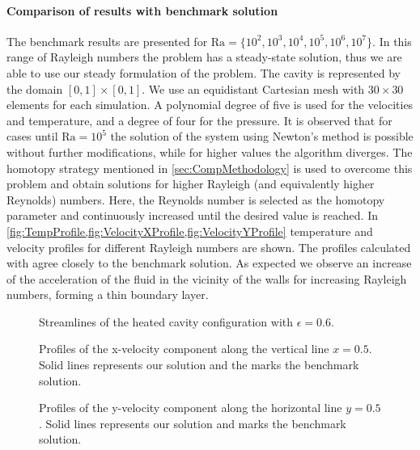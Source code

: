 \paragraph{Comparison of results with benchmark solution}
The benchmark results \cite{vierendeelsBenchmarkSolutionsNatural2003} are presented for $\text{Ra} = \{10^2,10^3,10^4,10^5,10^6,10^7\}$. In this range of Rayleigh numbers the problem has a steady-state solution, thus we are able to use our steady formulation of the problem. The cavity is represented by the domain $[0,1]\times[0,1]$. We use an equidistant Cartesian mesh with $30 \times 30$ elements for each simulation. A polynomial degree of five is used for the velocities and temperature, and a degree of four for the pressure. 
It is observed that for cases until  $\text{Ra} = 10^5$ the solution of the system using Newton's method is possible without further modifications, while for higher values the algorithm diverges. The homotopy strategy mentioned in \cref{sec:CompMethodology} is used to overcome this problem and obtain solutions for higher Rayleigh (and equivalently higher Reynolds) numbers. Here, the Reynolds number is selected as the homotopy parameter and continuously increased until the desired value is reached.
In \cref{fig:TempProfile,fig:VelocityXProfile,fig:VelocityYProfile} temperature and velocity profiles for different Rayleigh numbers are shown. The profiles calculated with \BoSSS agree closely to the benchmark solution. As expected we observe 
an increase of the acceleration of the fluid in the vicinity of the walls for increasing Rayleigh numbers, forming a thin boundary layer. 



\begin{figure}
	\centering
	\pgfplotsset{width=0.45 \textwidth, compat=1.3}
	\caption{Streamlines of the heated cavity configuration with $\epsilon = 0.6$.}\label{fig:HSCStreamlines}
\end{figure}


\begin{figure}[!htb]
	\centering
	\pgfplotsset{width=0.20\textwidth, compat=1.3}
	\caption{ Profiles of the x-velocity component along the vertical line $x=0.5$. Solid lines represents our solution and the marks the benchmark solution. \cite{vierendeelsBenchmarkSolutionsNatural2003}}
	\label{fig:VelocityXProfile}
\end{figure}


\begin{figure}[b!]
	\centering
	\pgfplotsset{width=0.20\textwidth, compat=1.3}
	\caption{ Profiles of the y-velocity component along the horizontal line $y=0.5$. Solid lines represents our solution and marks the benchmark solution. \cite{vierendeelsBenchmarkSolutionsNatural2003}}
	\label{fig:VelocityYProfile}
\end{figure}

